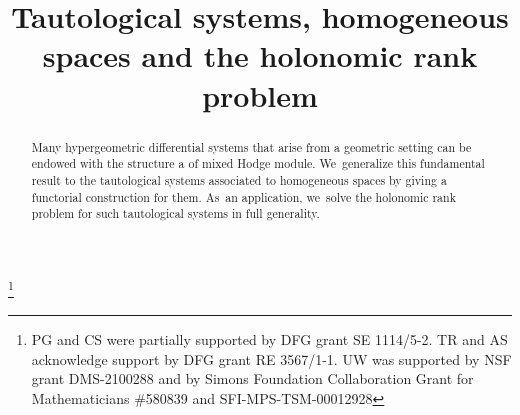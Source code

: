 \documentclass[JEP,XML,SOM,Unicode,published]{cedram}
\begin{document}
\frontmatter
\title{Tautological systems, homogeneous spaces and the holonomic rank problem}

\author[\initial{P.} \lastname{Görlach}]{ }
\address{Otto-von-Guericke-Universität Magdeburg,
Fakultät für Mathematik,
Institut für Algebra und Geometrie,\\
Universitätsplatz 2,
39106 Magdeburg,
Germany}

\author[\initial{T.} \lastname{Reichelt}]{ }
\address{Lehrstuhl für Mathematik VI,
Institut für Mathematik,
Universität Mannheim,\\
A 5, 6,
68131 Mannheim,
Germany}

\author[\initial{C.} \lastname{Sevenheck}]{ }
\address{Fakultät für Mathematik,
Technische Universität Chemnitz,\\
09107 Chemnitz,
Germany}

\author[\initial{A.} \lastname{Steiner}]{ }
\address{Fakultät für Mathematik,
Technische Universität Chemnitz,\\
09107 Chemnitz,
Germany}

\author[\initial{U.} \lastname{Walther}]{\nobreakauthor {}}
\address{Purdue University,
Dept.\ of Mathematics,\\
150 N.\ University St.,
West Lafayette, IN 47907,
USA}

\thanks{PG and CS were partially supported by DFG grant SE 1114/5-2.
TR and AS acknowledge support by DFG grant RE 3567/1-1.
UW was supported by NSF grant DMS-2100288 and by
Simons Foundation Collaboration Grant for Mathematicians \#580839 and SFI-MPS-TSM-00012928}


\begin{abstract}
Many hypergeometric differential systems that arise from a geometric setting can be endowed with the structure a of mixed Hodge module. We~generalize this fundamental result to the tautological systems associated to homogeneous spaces by giving a functorial construction for them. As~an application, we~solve the holonomic rank problem for such tautological systems in full generality.
\end{abstract}
\end{document}
